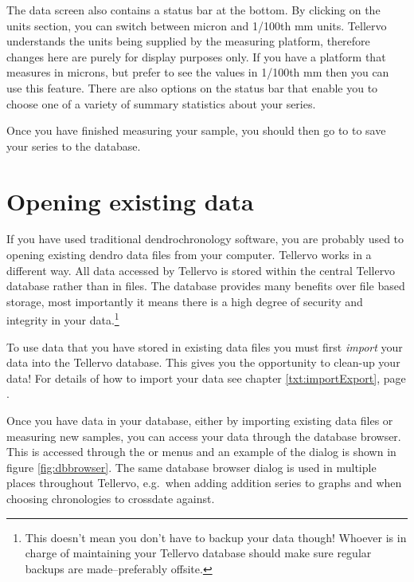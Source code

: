 The data screen also contains a status bar at the bottom. By clicking on the units section, you can switch between micron and 1/100th mm units. Tellervo understands the units being supplied by the measuring platform, therefore changes here are purely for display purposes only. If you have a platform that measures in microns, but prefer to see the values in 1/100th mm then you can use this feature.  There are also options on the status bar that enable you to choose one of a variety of summary statistics about your series.

Once you have finished measuring your sample, you should then go to  to save your series to the database. 


\section{Opening existing data}
\label{txt:open}
If you have used traditional dendrochronology software, you are probably used to opening existing dendro data files from your computer.  Tellervo works in a different way.  All data accessed by Tellervo is stored within the central Tellervo database rather than in files.  The database provides many benefits over file based storage, most importantly it means there is a high degree of security and integrity in your data.\footnote{This doesn't mean you don't have to backup your data though!  Whoever is in charge of maintaining your Tellervo database should make sure regular backups are made--preferably offsite.}

To use data that you have stored in existing data files you must first \emph{import} your data into the Tellervo database.  This gives you the opportunity to clean-up your data!  For details of how to import your data see chapter \ref{txt:importExport}, page \pageref{txt:importExport}.

Once you have data in your database, either by importing existing data files or measuring new samples, you can access your data through the database browser.  This is accessed through the  or  menus and an example of the dialog is shown in figure \ref{fig:dbbrowser}. The same database browser dialog is used in multiple places throughout Tellervo, e.g.\ when adding addition series to graphs and when choosing chronologies to crossdate against. 


